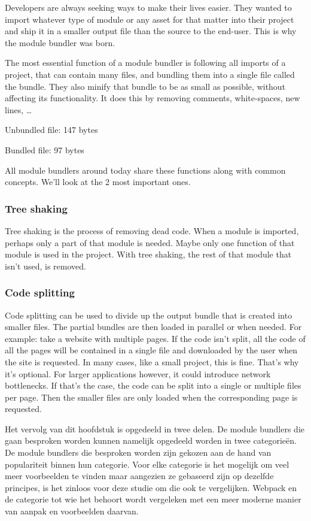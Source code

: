 Developers are always seeking ways to make their lives easier. They wanted to import whatever type of module or any asset for that matter into their project and ship it in a smaller output file than the source to the end-user. This is why the module bundler was born. 

The most essential function of a module bundler is following all imports of a project, that can contain many files, and bundling them into a single file called the bundle. They also minify that bundle to be as small as possible, without affecting its functionality. It does this by removing comments, white-spaces, new lines, … 

Unbundled file: 147 bytes

Bundled file: 97 bytes


All module bundlers around today share these functions along with common concepts. We’ll look at the 2 most important ones. 

\subsubsection{Tree shaking}

Tree shaking is the process of removing dead code. When a module is imported, perhaps only a part of that module is needed. Maybe only one function of that module is used in the project. With tree shaking, the rest of that module that isn’t used, is removed. 

\subsubsection{Code splitting}

Code splitting can be used to divide up the output bundle that is created into smaller files. The partial bundles are then loaded in parallel or when needed. For example: take a website with multiple pages. If the code isn’t split, all the code of all the pages will be contained in a single file and downloaded by the user when the site is requested. In many cases, like a small project, this is fine. That’s why it’s optional. For larger applications however, it could introduce network bottlenecks. If that’s the case, the code can be split into a single or multiple files per page. Then the smaller files are only loaded when the corresponding page is requested. 

Het vervolg van dit hoofdstuk is opgedeeld in twee delen. De module bundlers die gaan besproken worden kunnen namelijk opgedeeld worden in twee categorieën. De module bundlers die besproken worden zijn gekozen aan de hand van populariteit \autocite{stateofjs-2020} binnen hun categorie. Voor elke categorie is het mogelijk om veel meer voorbeelden te vinden maar aangezien ze gebaseerd zijn op dezelfde principes, is het zinloos voor deze studie om die ook te vergelijken. Webpack en de categorie tot wie het behoort wordt vergeleken met een meer moderne manier van aanpak en voorbeelden daarvan.

